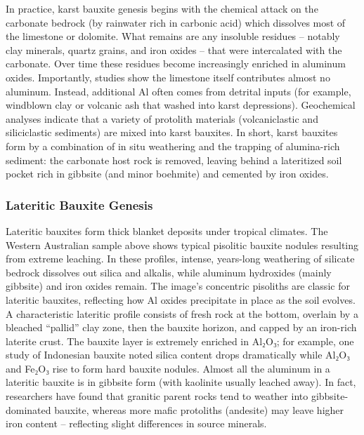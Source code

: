 \documentclass[12pt,a4paper, top=1.9cm, bottom=2.03cm, left=3.81cm, right=1.9cm]{article}
\begin{document}
\noindent\fontsize{12}{14}\selectfont In practice, karst bauxite genesis begins with the chemical attack on the carbonate bedrock (by rainwater rich in carbonic acid) which dissolves most of the limestone or dolomite. What remains are any insoluble residues – notably clay minerals, quartz grains, and iron oxides – that were intercalated with the carbonate. Over time these residues become increasingly enriched in aluminum oxides. Importantly, studies show the limestone itself contributes almost no aluminum. Instead, additional Al often comes from detrital inputs (for example, windblown clay or volcanic ash that washed into karst depressions). Geochemical analyses indicate that a variety of protolith materials (volcaniclastic and siliciclastic sediments) are mixed into karst bauxites. In short, karst bauxites form by a combination of in situ weathering and the trapping of alumina-rich sediment: the carbonate host rock is removed, leaving behind a lateritized soil pocket rich in gibbsite (and minor boehmite) and cemented by iron oxides.
\subsubsection{Lateritic Bauxite Genesis}
\noindent\fontsize{12}{14}\selectfont Lateritic bauxites form thick blanket deposits under tropical climates. The Western Australian sample above shows typical pisolitic bauxite nodules resulting from extreme leaching. In these profiles, intense, years-long weathering of silicate bedrock dissolves out silica and alkalis, while aluminum hydroxides (mainly gibbsite) and iron oxides remain. The image’s concentric pisoliths are classic for lateritic bauxites, reflecting how Al oxides precipitate in place as the soil evolves.
\noindent\fontsize{12}{14}\selectfont A characteristic lateritic profile consists of fresh rock at the bottom, overlain by a bleached “pallid” clay zone, then the bauxite horizon, and capped by an iron-rich laterite crust. The bauxite layer is extremely enriched in Al₂O₃; for example, one study of Indonesian bauxite noted silica content drops dramatically while Al₂O₃ and Fe₂O₃ rise to form hard bauxite nodules. Almost all the aluminum in a lateritic bauxite is in gibbsite form (with kaolinite usually leached away). In fact, researchers have found that granitic parent rocks tend to weather into gibbsite-dominated bauxite, whereas more mafic protoliths (andesite) may leave higher iron content – reflecting slight differences in source minerals.
\end{document}
